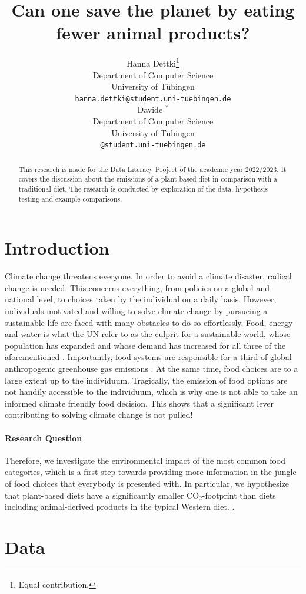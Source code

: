\documentclass{article}
\title{Can one save the planet by eating fewer animal products?}
\author{%
  Hanna Dettki\thanks{Equal contribution.} \\
  Department of Computer Science\\
  University of Tübingen\\
  \texttt{hanna.dettki@student.uni-tuebingen.de} \\
  \And
  Davide $^{*}$  \\
  Department of Computer Science\\
  University of Tübingen\\
  \texttt{@student.uni-tuebingen.de} \\
}
\begin{document}
\maketitle

\begin{abstract}
  This research is made for the Data Literacy Project of the academic year 2022/2023. It covers the discussion about the emissions of a plant based diet in comparison with a traditional diet. The research is conducted by exploration of the data, hypothesis testing and example comparisons. 
\end{abstract}

\section{Introduction}

Climate change threatens everyone. In order to avoid a climate disaster, radical change is needed. This concerns everything, from policies on a global and national level, to choices taken by the individual on a daily basis. 
However, individuals motivated and willing to solve climate change by pursueing a sustainable life are faced with many obstacles to do so effortlessly. Food, energy and water is what the UN refer to as the culprit for a sustainable world, whose population has expanded and whose demand has increased for all three of the aforementioned  \cite{Ritchie2020}.
 Importantly, food systems are responsible for a third of global anthropogenic greenhouse gas emissions \cite{Crippa2021}. At the same time, food choices are to a large extent up to the individuum.  Tragically,  the emission of food options are not handily accessible to the individuum, which is why one is not able to take an informed climate friendly food decision. This shows that a significant lever contributing to solving climate change is not pulled!
\paragraph*{Research Question}
Therefore, we investigate the environmental impact of the most common food categories, which is a first step towards  providing more information in the jungle of food choices that everybody is presented with. In particular, we hypothesize that  plant-based diets  have a significantly smaller CO$_2$-footprint than  diets including animal-derived products in the typical Western diet. .

\section{Data}
\label{data}
\end{document}
